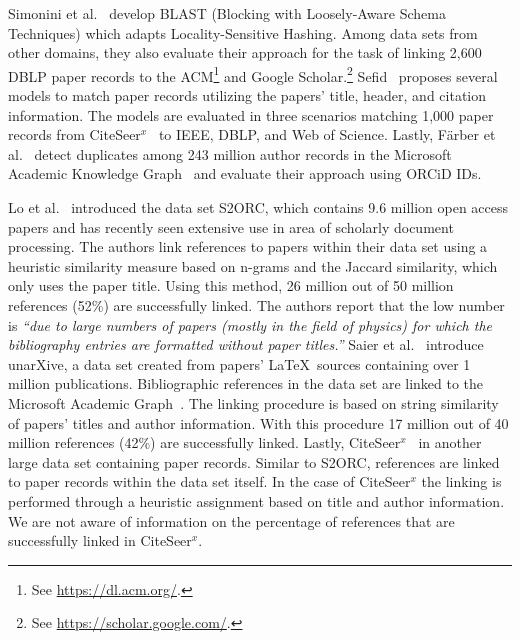 Simonini et al.~\cite{Simonini2016blast} develop BLAST (Blocking with Loosely-Aware Schema Techniques) which adapts Locality-Sensitive Hashing. Among data sets from other domains, they also evaluate their approach for the task of linking 2,600 DBLP paper records to the ACM\footnote{See \url{https://dl.acm.org/}.} and Google Scholar.\footnote{See \url{https://scholar.google.com/}.} 
Sefid~\cite{Sefid2019} proposes several models to match paper records utilizing the papers' title, header, and citation information. The models are evaluated in three scenarios matching 1,000 paper records from CiteSeer$^x$~\cite{CiteSeerX2019} to IEEE, DBLP, and Web of Science.
Lastly, Färber et al.~\cite{FaerberLin2022} detect duplicates among 243 million author records in the Microsoft Academic Knowledge Graph~\cite{MAKG} and evaluate their approach using ORCiD IDs.

%
Lo et al.~\cite{Lo2020} introduced the data set S2ORC, which contains 9.6 million open access papers and has recently seen extensive use in area of scholarly document processing. The authors link references to papers within their data set using a heuristic similarity measure based on n-grams and the Jaccard similarity, which only uses the paper title. Using this method, 26 million out of 50 million references  (52\%) are successfully linked. The authors report that the low number is \textit{``due to large numbers of papers (mostly in the field of physics) for which the bibliography entries are formatted without paper titles.''} Saier et al.~\cite{Saier2020} introduce unarXive, a data set created from papers' \LaTeX\ sources containing over 1 million publications. Bibliographic references in the data set are linked to the Microsoft Academic Graph~\cite{Sinha2015,Wang2019}. The linking procedure is based on string similarity of papers' titles and author information. With this procedure 17 million out of 40 million references (42\%) are successfully linked.
Lastly, CiteSeer$^x$~\cite{CiteSeerX2015,CiteSeerX2019} in another large data set containing paper records. Similar to S2ORC, references are linked to paper records within the data set itself. In the case of CiteSeer$^x$ the linking is performed through a heuristic assignment based on title and author information.  We are not aware of information on the percentage of references that are successfully linked in CiteSeer$^x$.

